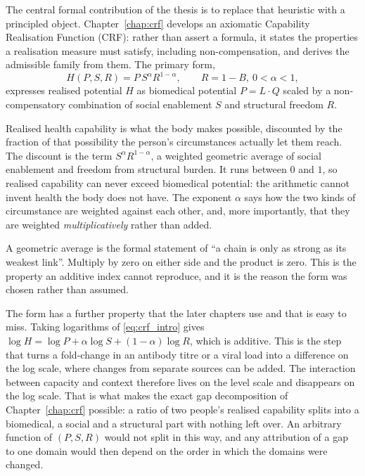 The central formal contribution of the thesis is to replace that heuristic with a principled object. Chapter~\ref{chap:crf} develops an axiomatic Capability Realisation Function (CRF): rather than assert a formula, it states the properties a realisation measure must satisfy, including non-compensation, and derives the admissible family from them. The primary form, \citep{cobb_douglas_1928}
\begin{equation}
    H(P,S,R)=P\,S^{\alpha}R^{1-\alpha},\qquad R=1-B,\ 0<\alpha<1,
    \label{eq:crf_intro}
\end{equation}
expresses realised potential $H$ as biomedical potential $P=L\cdot Q$ scaled by a non-compensatory combination of social enablement $S$ and structural freedom $R$.

\begin{reading}
Realised health capability is what the body makes possible, discounted by the
fraction of that possibility the person's circumstances actually let them
reach. The discount is the term $S^{\alpha}R^{1-\alpha}$, a weighted geometric
average of social enablement and freedom from structural burden. It runs
between $0$ and $1$, so realised capability can never exceed biomedical
potential: the arithmetic cannot invent health the body does not have. The
exponent $\alpha$ says how the two kinds of circumstance are weighted against
each other, and, more importantly, that they are weighted \emph{multiplicatively}
rather than added.

A geometric average is the formal statement of ``a chain is only as strong as
its weakest link''. Multiply by zero on either side and the product is zero.
This is the property an additive index cannot reproduce, and it is the reason
the form was chosen rather than assumed.
\end{reading}

The form has a further property that the later chapters use and that is easy to
miss. Taking logarithms of \eqref{eq:crf_intro} gives
$\log H=\log P+\alpha\log S+(1-\alpha)\log R$, which is additive. This is the step that turns a fold-change in an antibody titre or a viral load into a difference on the log scale, where changes from separate sources can be added. The
interaction between capacity and context therefore lives on the level scale and
disappears on the log scale. That is what makes the exact gap decomposition of
Chapter~\ref{chap:crf} possible: a ratio of two people's realised capability
splits into a biomedical, a social and a structural part with nothing left
over. An arbitrary function of $(P,S,R)$ would not split in this way, and any
attribution of a gap to one domain would then depend on the order in which the
domains were changed.


